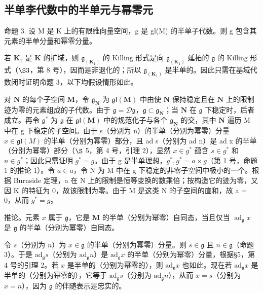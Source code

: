 \subsection{半单李代数中的半单元与幂零元}

命题 3. 设 M 是 K 上的有限维向量空间，g 是 gl(M) 的半单子代数。则 g 包含其元素的半单分量和幂零分量。

若 \(\mathbf{K}_1\) 是 \(\mathbf{K}\) 的扩域，则 \(\mathfrak{g}_{(\mathbf{K}_1)}\) 的 Killing 形式是向 \(\mathfrak{g}_{(\mathbf{K}_1)}\) 延拓的 \(\mathfrak{g}\) 的 Killing 形式（\(\S 3\)，第 8 号），因而是非退化的；所以 \(\mathfrak{g}_{(\mathbf{K}_1)}\) 是半单的。因此只需在基域代数闭时证明命题 3，以下均假设情形如此。

对 \(\mathbf{N}\) 的每个子空间 \(\mathbf{M}\)，令 \(\mathfrak{g}_{\mathbf{N}}\) 为 \(\mathfrak{gl}(\mathbf{M})\) 中由使 \(\mathbf{N}\) 保持稳定且在 \(\mathbf{N}\) 上的限制迹为零的元素组成的子代数。由于 \(\mathfrak{g} = \mathcal{D}\mathfrak{g}\)，\(\mathfrak{g} \subset \mathfrak{g}_{\mathbf{N}}\)；当 \(\mathbf{N}\) 在 \(\mathfrak{g}\) 下稳定时，后者成立。再令 \(\mathfrak{g}^*\) 为 \(\mathfrak{g}\) 在 \(\mathfrak{gl}(\mathbf{M})\) 中的规范化子与各个 \(\mathfrak{g}_{\mathbf{N}}\) 的交，其中 \(\mathbf{N}\) 遍历 M 中在 g 下稳定的子空间。由于 s（分别为 n）的半单（分别为幂零）分量 \(x \in \mathfrak{gl}(M)\) 的半单（分别为幂零）部分，且 ad s（分别为 ad n）是 ad x 的半单（分别为幂零）部分（\(\S\) 5，第 4 号，引理 2），显然 \(x \in g^{*}\) 蕴含 \(s \in g^{*}\) 和 \(n \in g^{*}\)；因此只需证明 \(g^{*} = g\)。由于 g 是半单理想，\(g^{*}, g^{*} = a \times g\)（第 1 号，命题 1 的推论 1）。令 \(a \in a\)，令 N 为 M 中在 g 下稳定的非零子空间中极小的一个。根据 Burnside 定理，a 在 N 上的限制是恒等变换的数乘倍；按构造它的迹为零，又因 K 的特征为 0，故该限制为零。由于 M 是这类 N 的子空间的直和，故 a = 0，从而 \(g^{*} = g\)。

推论。元素 \(x\) 属于 \(\mathfrak{g}\)，它是 \(\mathbf{M}\) 的半单（分别为幂零）自同态，当且仅当 \(\operatorname{ad}_{\mathfrak{g}} x\) 是 \(\mathfrak{g}\) 的半单（分别为幂零）自同态。

令 \(s\)（分别为 \(n\)）为 \(x \in \mathfrak{g}\) 的半单（分别为幂零）分量。则 \(s \in \mathfrak{g}\) 且 \(n \in \mathfrak{g}\)（命题 3）。于是 \(\mathrm{ad}_{\mathfrak{g}} s\)（分别为 \(\mathrm{ad}_{\mathfrak{g}} n\)）是 \(\mathrm{ad}_{\mathfrak{g}} x\) 的半单（分别为幂零）分量，根据§5，第 4 号的引理 2。若 \(x\) 是半单的（分别为幂零的），则 \(\mathrm{ad}_{\mathfrak{g}} x\) 也如此。现在若 \(\mathrm{ad}_{\mathfrak{g}} x\) 是半单的（分别为幂零的），它等于 \(\mathrm{ad}_{\mathfrak{g}} s\)（分别为 \(\mathrm{ad}_{\mathfrak{g}} n\)），从而 \(x = s\)（分别为 \(x = n\)），因为 \(\mathfrak{g}\) 的伴随表示是忠实的。

